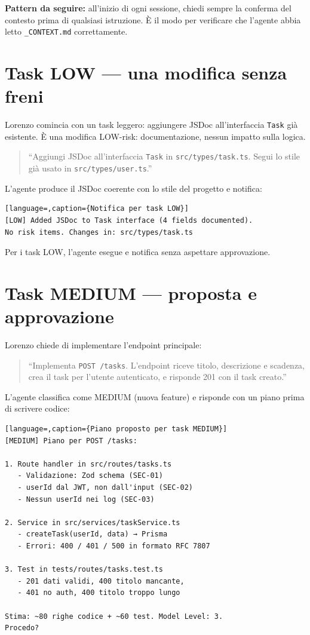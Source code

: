 \begin{tipbox}
\textbf{Pattern da seguire:} all'inizio di ogni sessione, chiedi sempre la conferma del contesto prima di qualsiasi istruzione. È il modo per verificare che l'agente abbia letto \texttt{\_CONTEXT.md} correttamente.
\end{tipbox}

\section{Task LOW --- una modifica senza freni}
\label{sec:03-task-low}

Lorenzo comincia con un task leggero: aggiungere JSDoc all'interfaccia \texttt{Task} già esistente. È una modifica LOW-risk: documentazione, nessun impatto sulla logica.

\begin{quote}
``Aggiungi JSDoc all'interfaccia \texttt{Task} in \texttt{src/types/task.ts}. Segui lo stile già usato in \texttt{src/types/user.ts}.''
\end{quote}

L'agente produce il JSDoc coerente con lo stile del progetto e notifica:

\begin{lstlisting}[language=,caption={Notifica per task LOW}]
[LOW] Added JSDoc to Task interface (4 fields documented).
No risk items. Changes in: src/types/task.ts
\end{lstlisting}

Per i task LOW, l'agente esegue e notifica senza aspettare approvazione.

\section{Task MEDIUM --- proposta e approvazione}
\label{sec:03-task-medium}

Lorenzo chiede di implementare l'endpoint principale:

\begin{quote}
``Implementa \texttt{POST /tasks}. L'endpoint riceve titolo, descrizione e scadenza, crea il task per l'utente autenticato, e risponde 201 con il task creato.''
\end{quote}

L'agente classifica come MEDIUM (nuova feature) e risponde con un piano prima di scrivere codice:

\begin{lstlisting}[language=,caption={Piano proposto per task MEDIUM}]
[MEDIUM] Piano per POST /tasks:

1. Route handler in src/routes/tasks.ts
   - Validazione: Zod schema (SEC-01)
   - userId dal JWT, non dall'input (SEC-02)
   - Nessun userId nei log (SEC-03)

2. Service in src/services/taskService.ts
   - createTask(userId, data) → Prisma
   - Errori: 400 / 401 / 500 in formato RFC 7807

3. Test in tests/routes/tasks.test.ts
   - 201 dati validi, 400 titolo mancante,
   - 401 no auth, 400 titolo troppo lungo

Stima: ~80 righe codice + ~60 test. Model Level: 3.
Procedo?
\end{lstlisting}

